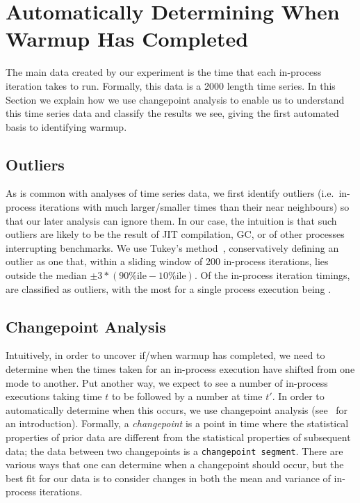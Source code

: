 \documentclass[preprint,numbers,10pt]{sigplanconf}
\begin{document}
\section{Automatically Determining When Warmup Has Completed}
\label{sec:stats}

The main data created by our experiment is the time that each in-process
iteration takes to run. Formally, this data is a 2000 length time series. In
this Section we explain how we use changepoint analysis to enable us to
understand this time series data and classify the results we see, giving the
first automated basis to identifying warmup.


\subsection{Outliers}

As is common with analyses of time series data, we first identify outliers
(i.e.~in-process iterations with much larger/smaller times than their near
neighbours) so that our later analysis can ignore them. In our case, the
intuition is that such outliers are likely to be the result of JIT compilation,
GC, or of other processes interrupting benchmarks. We use Tukey's
method~\cite{tukey1977exploratory}, conservatively defining an outlier as one that, within a
sliding window of 200 in-process iterations, lies outside the median $\pm
3*(90\%\textrm{ile} - 10\%\textrm{ile})$. Of the  in-process
iteration timings,  are classified as outliers, with the most for
a single process execution being .


\subsection{Changepoint Analysis}

Intuitively, in order to uncover if/when warmup has completed, we need to
determine when the times taken for an in-process execution have shifted from one
mode to another. Put another way, we expect to see a number of in-process
executions taking time $t$ to be followed by a number at time $t'$. In order to
automatically determine when this occurs, we use changepoint analysis
(see~\cite{EckleyFearnheadKillick2011} for an introduction). Formally, a
\emph{changepoint} is a point in time where the statistical properties of prior
data are different from the statistical properties of subsequent data; the data
between two changepoints is a \texttt{changepoint segment}. There are various
ways that one can determine when a changepoint should occur, but the best fit
for our data is to consider changes in both the mean and variance of in-process
iterations.
\end{document}
